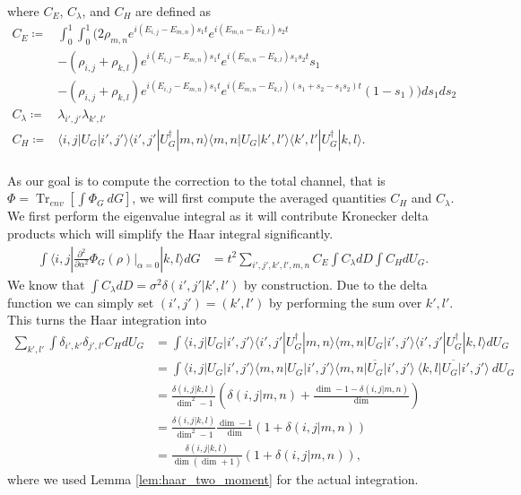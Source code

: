 \documentclass{article}
\newcommand{\ket}[1]{|#1\rangle}
\newcommand{\bra}[1]{\langle #1|}
\newcommand{\parens}[1]{\left( #1 \right)}
\newcommand{\brackets}[1]{\left[ #1 \right]}
\DeclareMathOperator{\Tr}{Tr}
\newcommand{\partrace}[2]{\Tr_{#1} \brackets{ #2 }}
\begin{document}
where $C_E$, $C_{\lambda}$, and $C_{H}$ are defined as
\begin{align}
    C_E \coloneqq& \int_0^1 \int_0^1 \bigg(  2 \rho_{m,n} e^{i(E_{i,j} - E_{m,n})s_1t} e^{i(E_{m,n} - E_{k,l})s_2 t}  \\
    &- (\rho_{i,j} + \rho_{k,l}) e^{i(E_{i,j} - E_{m,n})s_1 t} e^{i(E_{m,n} - E_{k,l})s_1 s_2 t} s_1 \\
    &- (\rho_{i,j} + \rho_{k,l}) e^{i(E_{i,j} - E_{m,n})s_1 t} e^{i(E_{m,n} - E_{k,l})(s_1 + s_2 - s_1 s_2)t} (1-s_1) \bigg) ds_1 ds_2 \\
    C_{\lambda} \coloneqq& \lambda_{i',j'} \lambda_{k',l'} \\
    C_H \coloneqq& \bra{i,j} U_G \ket{i',j'} \bra{i',j'} U_G^\dagger \ket{m,n} \bra{m,n} U_G \ket{k',l'} \bra{k',l'} U_G^\dagger \ket{k,l}. \\
\end{align} 

As our goal is to compute the correction to the total channel, that is $\Phi = \partrace{env}{\int \Phi_G ~dG}$, we will first compute the averaged quantities $C_H$ and $C_\lambda$. We first perform the eigenvalue integral as it will contribute Kronecker delta products which will simplify the Haar integral significantly. 
\begin{align}
    \int \bra{i,j} \frac{\partial^2}{\partial \alpha^2} \Phi_G(\rho) \bigg|_{\alpha = 0} \ket{k,l} dG &= t^2 \sum_{i',j',k',l',m,n} C_E \int C_{\lambda} dD \int C_{H} dU_G. \label{eq:second_order_alpha_factored}
\end{align}
We know that $\int C_{\lambda} dD = \sigma^2 \delta(i',j' | k',l')$ by construction. Due to the delta function we can simply set $(i',j') = (k',l')$ by performing the sum over $k',l'$. This turns the Haar integration into
\begin{align}
    \sum_{k', l'} \int \delta_{i', k'} \delta_{j', l'} C_{H} dU_G &= \int \bra{i,j} U_G \ket{i',j'} \bra{i',j'} U_G^\dagger \ket{m,n} \bra{m,n} U_G \ket{i',j'} \bra{i',j'} U_G^\dagger \ket{k,l} dU_G \\
    &= \int \bra{i,j} U_G \ket{i',j'}  \bra{m,n} U_G \ket{i',j'} \overline{\bra{m,n} U_G \ket{i',j'}} ~ \overline{ \bra{k,l} U_G \ket{i',j'} }~ dU_G \\
    &= \frac{\delta(i,j | k,l)}{\dim^2 - 1} \parens{\delta(i,j | m,n) + \frac{\dim - 1 - \delta(i,j | m,n)}{\dim}} \\
    &= \frac{\delta(i,j | k,l)}{\dim^2 - 1} \frac{\dim - 1}{\dim} \parens{1 + \delta(i,j | m,n)} \\
    &= \frac{\delta(i, j | k,l)}{\dim (\dim + 1)} (1 + \delta(i,j | m,n)),
\end{align}
where we used Lemma \ref{lem:haar_two_moment} for the actual integration.
\end{document}
